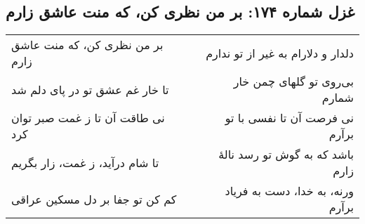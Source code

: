\begin{center}
\section*{غزل شماره ۱۷۴: بر من نظری کن، که منت عاشق زارم}
\label{sec:174}
\begin{longtable}{l p{0.5cm} r}
بر من نظری کن، که منت عاشق زارم
&&
دلدار و دلارام به غیر از تو ندارم
\\
تا خار غم عشق تو در پای دلم شد
&&
بی‌روی تو گلهای چمن خار شمارم
\\
نی طاقت آن تا ز غمت صبر توان کرد
&&
نی فرصت آن تا نفسی با تو برآرم
\\
تا شام درآید، ز غمت، زار بگریم
&&
باشد که به گوش تو رسد نالهٔ زارم
\\
کم کن تو جفا بر دل مسکین عراقی
&&
ورنه، به خدا، دست به فریاد برآرم
\\
\end{longtable}
\end{center}

